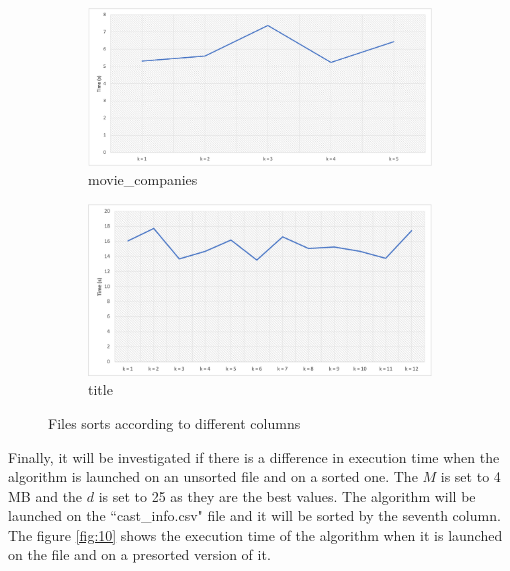 \documentclass[12pt]{article}
\begin{document}
\begin{figure}[H]
\begin{adjustwidth}{-3.5cm}{-3.5cm}
\begin{subfigure}[b]{0.5\linewidth}
    \centering
    \includegraphics[width=0.99\linewidth]{images/movie_companies.png} 
    \caption{movie\_companies} 
    \label{fig:9c} 
  \end{subfigure}%
  \begin{subfigure}[b]{0.5\linewidth}
    \centering
    \includegraphics[width=0.99\linewidth]{images/title.png} 
    \caption{title} 
    \label{fig:9d} 
  \end{subfigure} 
  \caption{Files sorts according to different columns}
  \label{fig:9} 
\end{adjustwidth}
\end{figure}

Finally, it will be investigated if there is a difference in execution time when the algorithm is launched on an unsorted file and on a sorted one. The $M$ is set to 4 MB and the $d$ is set to 25 as they are the best values. The algorithm will be launched on the ``cast\_info.csv" file and it will be sorted by the seventh column. The figure \ref{fig:10} shows the execution time of the algorithm when it is launched on the file and on a presorted version of it.
\end{document}

